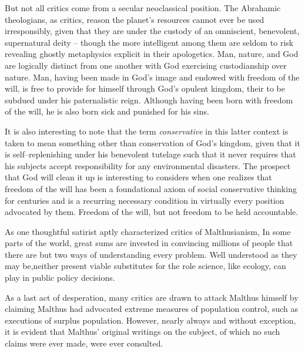 But not all critics come from a secular neoclassical position. The Abrahamic theologians, as critics, reason the planet's resources cannot ever be used irresponsibly, given that they are under the custody of an omniscient, benevolent,  supernatural deity -- though the more intelligent among them are seldom to risk revealing ghostly metaphysics explicit in their apologetics. Man, nature, and God are logically distinct from one another with God exercising custodianship over nature. Man, having been made in God's image and endowed with freedom of the will, is free to provide for himself through God's opulent kingdom, their to be subdued under his paternalistic reign. Although having been born with freedom of the will, he is also born sick and punished for his sins.

It is also interesting to note that the term {\it conservative} in this latter context is taken to mean something other than conservation of God's kingdom, given that it is self--replenishing under his benevolent tutelage such that it never requires that his subjects accept responsibility for any environmental disasters. The prospect that God will clean it up is interesting to considers when one realizes that freedom of the will has been a foundational axiom of social conservative thinking for centuries and is a recurring necessary condition in virtually every position advocated by them. Freedom of the will, but not freedom to be held accountable.

As one thoughtful satirist aptly characterized critics of Malthusianism,   In some parts of the world, great sums are invested in convincing millions of people that there are but two ways of understanding every problem. Well understood as they may be,\footnotecite[goodnight1980] neither present viable substitutes for the role science, like ecology, can play in public policy decisions.

As a last act of desperation, many critics are drawn to attack Malthus himself by claiming Malthus had advocated extreme measures of population control, such as executions of surplus population. However, nearly always and without exception, it is evident that Malthus' original writings on the subject, of which no such claims were ever made, were ever consulted.

